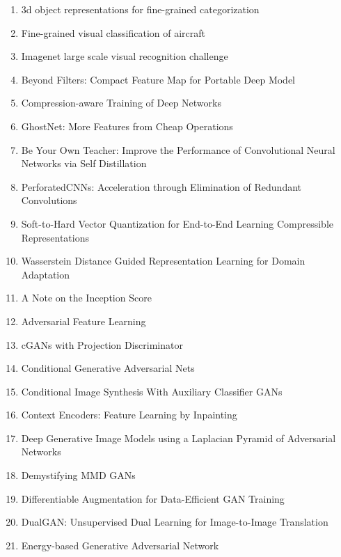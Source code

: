 \documentclass[acmlarge]{acmart}
\begin{document}
\begin{enumerate}
	\item 3d object representations for fine-grained categorization \cite{krause20133d}
	\item Fine-grained visual classification of aircraft \cite{maji2013fine}
	\item Imagenet large scale visual recognition challenge \cite{russakovsky2015imagenet}
	\item Beyond Filters: Compact Feature Map for Portable Deep Model \cite{pmlr-v70-wang17m}
	\item Compression-aware Training of Deep Networks \cite{alvarez2017compressionaware}
	\item GhostNet: More Features from Cheap Operations \cite{han2019ghostnet}
	\item Be Your Own Teacher: Improve the Performance of Convolutional Neural Networks via Self Distillation \cite{zhang2019teacher}
	\item PerforatedCNNs: Acceleration through Elimination of Redundant Convolutions \cite{figurnov2015perforatedcnns}
	\item Soft-to-Hard Vector Quantization for End-to-End Learning Compressible Representations \cite{agustsson2017softtohard}
	\item Wasserstein Distance Guided Representation Learning for Domain Adaptation \cite{shen2017wasserstein}
	\item A Note on the Inception Score \cite{barratt2018note}
	\item Adversarial Feature Learning \cite{donahue2016adversarial}
	\item cGANs with Projection Discriminator \cite{miyato2018cgans}
	\item Conditional Generative Adversarial Nets \cite{mirza2014conditional}
	\item Conditional Image Synthesis With Auxiliary Classifier GANs \cite{odena2016conditional}
	\item Context Encoders: Feature Learning by Inpainting \cite{pathak2016context}
	\item Deep Generative Image Models using a Laplacian Pyramid of Adversarial Networks \cite{denton2015deep}
	\item Demystifying MMD GANs \cite{bikowski2018demystifying}
	\item Differentiable Augmentation for Data-Efficient GAN Training \cite{zhao2020differentiable}
	\item DualGAN: Unsupervised Dual Learning for Image-to-Image Translation \cite{yi2017dualgan}
	\item Energy-based Generative Adversarial Network \cite{zhao2016energybased}

\end{enumerate}
\end{document}
